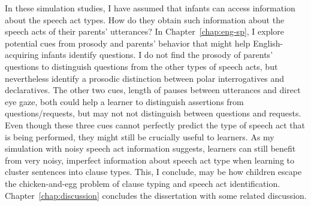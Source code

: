 In these simulation studies, I have assumed that infants can access information about the speech act types. How do they obtain such information about the speech acts of their parents' utterances? In Chapter~\ref{chap:eng-sp}, I explore potential cues from prosody and parents' behavior that might help English-acquiring infants identify questions. I do not find the prosody of parents' questions to distinguish questions from the other types of speech acts, but nevertheless identify a prosodic distinction between polar interrogatives and declaratives. The other two cues, length of pauses between utterances and direct eye gaze, both could help a learner to distinguish assertions from questions/requests, but may not not distinguish between questions and requests. Even though these three cues cannot perfectly predict the type of speech act that is being performed, they might still be crucially useful to learners. As my simulation with noisy speech act information suggests, learners can still benefit from very noisy, imperfect information about speech act type when learning to cluster sentences into clause types. This, I conclude, may be how children escape the chicken-and-egg problem of clause typing and speech act identification. Chapter~\ref{chap:discussion} concludes the dissertation with some related discussion.


